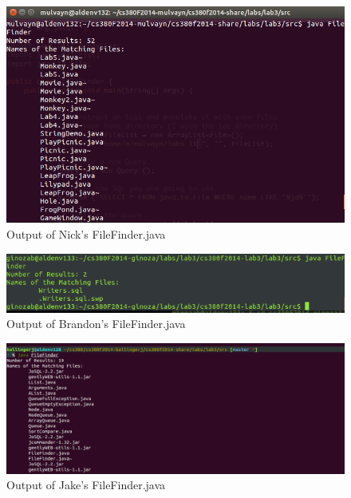 \begin{enumerate}
		\begin{figure}[h!]                                                              
			\centerline{\includegraphics[scale=0.5]{../pic/Nick.png}}                       
			\caption{Output of Nick's FileFinder.java}                                         
		\end{figure}          

		\begin{figure}[h!]                                                              
			\centerline{\includegraphics[scale=0.5]{../pic/Brandon.png}}                       
			\caption{Output of Brandon's FileFinder.java}                                         
		\end{figure}          

		\begin{figure}[h!]                                                              
			\centerline{\includegraphics[scale=0.5]{../pic/Jake.png}}                       
			\caption{Output of Jake's FileFinder.java}                                         
		\end{figure}          


\end{enumerate}
